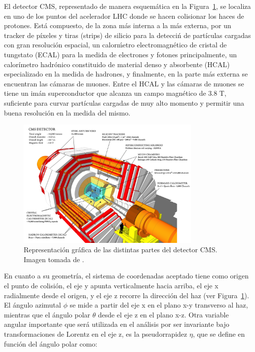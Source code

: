 
El detector CMS, representado de manera esquem\'atica en la Figura~\ref{fig:CMS}, se localiza en uno de los puntos del acelerador LHC donde se hacen colisionar los haces de protones. Est\'a compuesto, de la zona m\'as interna a la m\'as externa, por un tracker de p\'ixeles y tiras (strips) de silicio para la detecci\'n de partículas cargadas con gran resoluci\'on espacial, un calor\'metro electromagn\'etico de cristal de tungstato (ECAL) para la medida de electrones y fotones principalmente, un calor\'imetro hadr\'onico constituido de material denso y absorbente (HCAL) especializado en la medida de hadrones, y finalmente, en la parte m\'as externa se encuentran las c\'amaras de muones. Entre el HCAL y las c\'amaras de muones se tiene un im\'an superconductor que alcanza un campo magn\'etico de 3.8 T, suficiente para curvar part\'iculas cargadas de muy alto momento y permitir una buena resoluci\'on en la medida del mismo.

\begin{figure}[h]
\centering
\includegraphics[width=0.80\textwidth]{figures/cms_160312_02.png}
\caption{Representaci\'on gr\'afica de las distintas partes del detector CMS. Imagen tomada de \cite{Sakuma:2665537}.}
\label{fig:CMS}        
\end{figure}

En cuanto a su geometr\'ia, el sistema de coordenadas aceptado tiene como origen el punto de colisi\'on, el eje y apunta verticalmente hacia arriba, el eje x radialmente desde el origen, y el eje z recorre la direcci\'on del haz (ver Figura~\ref{fig:CMS}). El \'angulo azimutal $\phi$ se mide a partir del eje x en el plano x-y transverso al haz, mientras que el \'angulo polar $\theta$ desde el eje z en el plano x-z. Otra variable angular importante que ser\'a utilizada en el an\'alisis por ser invariante bajo transformaciones de Lorentz en el eje z, es la pseudorrapidez $\eta$, que se define en funci\'on del \'angulo polar como:

